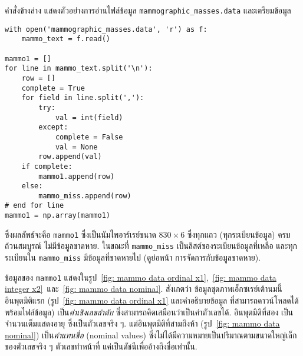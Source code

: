 \begin{Exercise}
คำสั่งข้างล่าง แสดงตัวอย่างการอ่านไฟล์ข้อมูล \verb|mammographic_masses.data| และเตรียมข้อมูล
\begin{Verbatim}[fontsize=\small]
with open('mammographic_masses.data', 'r') as f:
    mammo_text = f.read()
    
mammo1 = []
for line in mammo_text.split('\n'):
    row = []
    complete = True
    for field in line.split(','):
        try:
            val = int(field)
        except:
            complete = False
            val = None
        row.append(val)
    if complete:
        mammo1.append(row)
    else:
        mammo_miss.append(row)
# end for line
mammo1 = np.array(mammo1)
\end{Verbatim}
ซึ่งผลลัพธ์จะคือ \verb|mammo1| ซึ่งเป็นนัมไพอาร์เรย์ขนาด $830 \times 6$ ซึ่งทุกแถว (ทุกระเบียนข้อมูล) ครบถ้วนสมบูรณ์ ไม่มีข้อมูลขาดหาย.
ในขณะที่ \verb|mammo_miss| เป็นลิสต์ของระเบียนข้อมูลที่เหลือ
และทุกระเบียนใน \verb|mammo_miss| มีข้อมูลที่ขาดหายไป (ดูย่อหน้า การจัดการกับข้อมูลขาดหาย).

ข้อมูลของ \verb|mammo1| แสดงในรูป~\ref{fig: mammo data ordinal x1},~\ref{fig: mammo data integer x2}~และ~\ref{fig: mammo data nominal}.
สังเกตว่า ข้อมูลชุดภาพเอ็กซเรย์เต้านมนี้ อินพุตมิติแรก (รูป~\ref{fig: mammo data ordinal x1} และคำอธิบายข้อมูล ที่สามารถดาวน์โหลดได้พร้อมไฟล์ข้อมูล) เป็น\textit{ค่าเชิงเลขลำดับ} ซึ่งสามารถคิดเสมือนว่าเป็นค่าตัวเลขได้.
อินพุตมิติที่สอง เป็นจำนวนเต็มแสดงอายุ ซึ่งเป็นตัวเลขจริง ๆ.
แต่อินพุตมิติที่สามถึงห้า (รูป~\ref{fig: mammo data nominal})
เป็น\textit{ค่าแทนชื่อ} (nominal values)
ซึ่งไม่ได้มีความหมายเป็นปริมาณตามขนาดใหญ่เล็กของตัวเลขจริง ๆ
ตัวเลขทำหน้าที่ แค่เป็นดัชนีเพื่ออ้างถึงชื่อเท่านั้น.



\end{Exercise}
